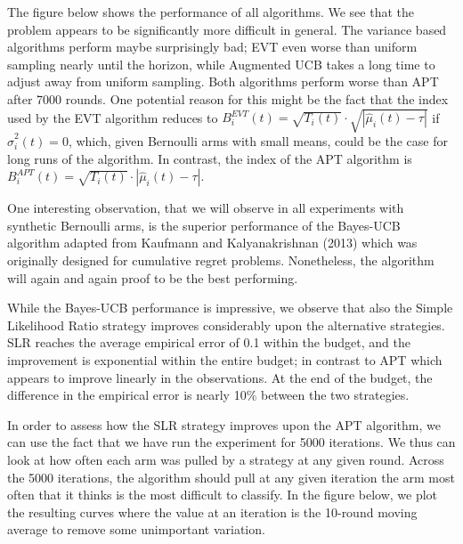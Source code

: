 \documentclass[12pt,]{article}
\begin{document}
The figure below shows the performance of all algorithms. We see that
the problem appears to be significantly more difficult in general. The
variance based algorithms perform maybe surprisingly bad; EVT even worse
than uniform sampling nearly until the horizon, while Augmented UCB
takes a long time to adjust away from uniform sampling. Both algorithms
perform worse than APT after 7000 rounds. One potential reason for this
might be the fact that the index used by the EVT algorithm reduces to
\(B_i^{EVT}(t) = \sqrt{T_i(t)} \cdot \sqrt{|\hat{\mu}_i(t) - \tau|}\) if
\(\hat{\sigma}_i^2(t) = 0\), which, given Bernoulli arms with small
means, could be the case for long runs of the algorithm. In contrast,
the index of the APT algorithm is
\(B_i^{APT}(t) = \sqrt{T_i(t)} \cdot |\hat{\mu}_i(t) - \tau|\).

One interesting observation, that we will observe in all experiments
with synthetic Bernoulli arms, is the superior performance of the
Bayes-UCB algorithm adapted from Kaufmann and Kalyanakrishnan (2013)
which was originally designed for cumulative regret problems.
Nonetheless, the algorithm will again and again proof to be the best
performing.

While the Bayes-UCB performance is impressive, we observe that also the
Simple Likelihood Ratio strategy improves considerably upon the
alternative strategies. SLR reaches the average empirical error of 0.1
within the budget, and the improvement is exponential within the entire
budget; in contrast to APT which appears to improve linearly in the
observations. At the end of the budget, the difference in the empirical
error is nearly 10\% between the two strategies.

In order to assess how the SLR strategy improves upon the APT algorithm,
we can use the fact that we have run the experiment for 5000 iterations.
We thus can look at how often each arm was pulled by a strategy at any
given round. Across the 5000 iterations, the algorithm should pull at
any given iteration the arm most often that it thinks is the most
difficult to classify. In the figure below, we plot the resulting curves
where the value at an iteration is the 10-round moving average to remove
some unimportant variation.
\end{document}
